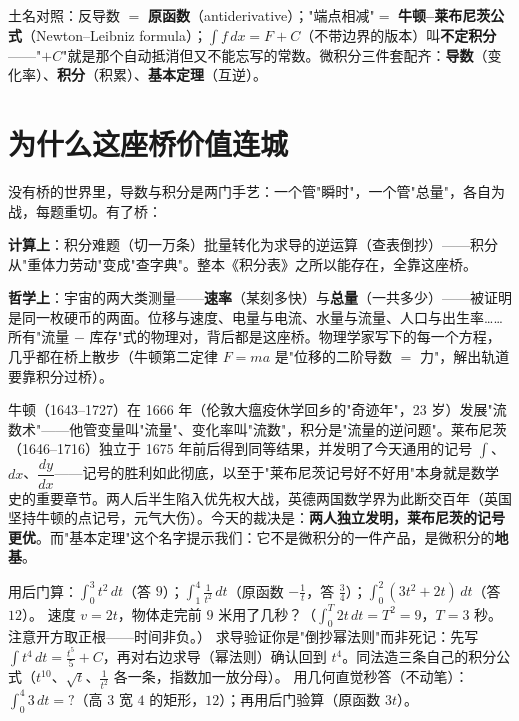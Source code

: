 \begin{cidian}
土名对照：反导数 $=$ \textbf{原函数}（antiderivative）；"端点相减"$=$ \textbf{牛顿--莱布尼茨公式}（Newton--Leibniz formula）；$\displaystyle\int f\,dx = F + C$（不带边界的版本）叫\textbf{不定积分}——"$+C$"就是那个自动抵消但又不能忘写的常数。微积分三件套配齐：\textbf{导数}（变化率）、\textbf{积分}（积累）、\textbf{基本定理}（互逆）。
\end{cidian}

\section{为什么这座桥价值连城}

没有桥的世界里，导数与积分是两门手艺：一个管"瞬时"，一个管"总量"，各自为战，每题重切。有了桥：

\textbf{计算上}：积分难题（切一万条）批量转化为求导的逆运算（查表倒抄）——积分从"重体力劳动"变成"查字典"。整本《积分表》之所以能存在，全靠这座桥。

\textbf{哲学上}：宇宙的两大类测量——\textbf{速率}（某刻多快）与\textbf{总量}（一共多少）——被证明是同一枚硬币的两面。位移与速度、电量与电流、水量与流量、人口与出生率……所有"流量 $-$ 库存"式的物理对，背后都是这座桥。物理学家写下的每一个方程，几乎都在桥上散步（牛顿第二定律 $F = ma$ 是"位移的二阶导数 $=$ 力"，解出轨道要靠积分过桥）。

\begin{lishi}
牛顿（1643--1727）在 1666 年（伦敦大瘟疫休学回乡的"奇迹年"，23 岁）发展"流数术"——他管变量叫"流量"、变化率叫"流数"，积分是"流量的逆问题"。莱布尼茨（1646--1716）独立于 1675 年前后得到同等结果，并发明了今天通用的记号 $\int$、$dx$、$\dfrac{dy}{dx}$——记号的胜利如此彻底，以至于"莱布尼茨记号好不好用"本身就是数学史的重要章节。两人后半生陷入优先权大战，英德两国数学界为此断交百年（英国坚持牛顿的点记号，元气大伤）。今天的裁决是：\textbf{两人独立发明，莱布尼茨的记号更优}。而"基本定理"这个名字提示我们：它不是微积分的一件产品，是微积分的\textbf{地基}。
\end{lishi}

\begin{dongshou}
\begin{itemize}
  \yisi 用后门算：$\displaystyle\int_0^3 t^2\,dt$（答 $9$）；$\displaystyle\int_1^4 \frac{1}{t^2}\,dt$（原函数 $-\tfrac1t$，答 $\tfrac34$）；$\displaystyle\int_0^2 (3t^2 + 2t)\,dt$（答 $12$）。
  \yier 速度 $v = 2t$，物体走完前 $9$ 米用了几秒？（$\int_0^T 2t\,dt = T^2 = 9$，$T = 3$ 秒。注意开方取正根——时间非负。）
  \yier 求导验证你是"倒抄幂法则"而非死记：先写 $\displaystyle\int t^4\,dt = \tfrac{t^5}{5} + C$，再对右边求导（幂法则）确认回到 $t^4$。同法造三条自己的积分公式（$t^{10}$、$\sqrt t$、$\tfrac1{t^2}$ 各一条，指数加一放分母）。
  \yisi 用几何直觉秒答（不动笔）：$\displaystyle\int_0^4 3\,dt = ?$（高 $3$ 宽 $4$ 的矩形，$12$）；再用后门验算（原函数 $3t$）。
\end{itemize}
\end{dongshou}

